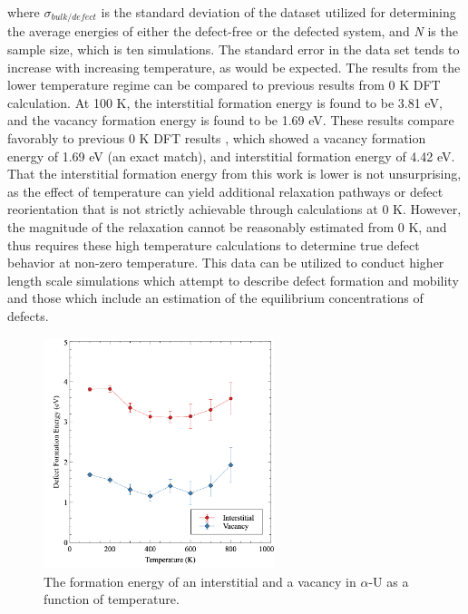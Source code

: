 \documentclass[review]{elsarticle}
\begin{document}
where $\sigma_{bulk/defect}$ is the standard deviation of the dataset utilized for determining the average energies of either the defect-free or the defected system, and \textit{N} is the sample size, which is ten simulations. The standard error in the data set tends to increase with increasing temperature, as would be expected. The results from the lower temperature regime can be compared to previous results from 0 K DFT calculation. At 100 K, the interstitial formation energy is found to be 3.81 eV, and the vacancy formation energy is found to be 1.69 eV. These results compare favorably to previous 0 K DFT results \cite{wirth2011}, which showed a vacancy formation energy of 1.69 eV (an exact match), and interstitial formation energy of 4.42 eV. That the interstitial formation energy from this work is lower is not unsurprising, as the effect of temperature can yield additional relaxation pathways or defect reorientation that is not strictly achievable through calculations at 0 K. However, the magnitude of the relaxation cannot be reasonably estimated from 0 K, and thus requires these high temperature calculations to determine true defect behavior at non-zero temperature. This data can be utilized to conduct higher length scale simulations which attempt to describe defect formation and mobility and those which include an estimation of the equilibrium concentrations of defects. 
 
 \begin{figure}[hbt]
	\centering
	\includegraphics[width=0.6\textwidth]{fig4.png}
    \caption{The formation energy of an interstitial and a vacancy in $\alpha$-U as a function of temperature.}\label{fig:defs}
\end{figure}

\FloatBarrier
\end{document}
